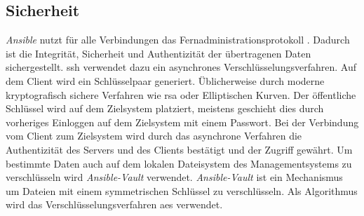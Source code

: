 \documentclass[titlepage]{report}
\begin{document}
\subsection*{Sicherheit}
\emph{Ansible} nutzt für alle Verbindungen das
Fernadministrationsprotokoll . Dadurch ist die Integrität,
Sicherheit und Authentizität der übertragenen Daten sichergestellt.
\gls{ssh} verwendet dazu ein asynchrones Verschlüsselungsverfahren. Auf
dem Client wird ein Schlüsselpaar generiert. Üblicherweise durch moderne
kryptografisch sichere Verfahren wie \gls{rsa} oder Elliptischen Kurven.
Der öffentliche Schlüssel wird auf dem Zielsystem platziert, meistens
geschieht dies durch vorheriges Einloggen auf dem Zielsystem mit einem
Passwort. Bei der Verbindung vom Client zum Zielsystem wird durch das
asynchrone Verfahren die Authentizität des Servers und des Clients
bestätigt und der Zugriff gewährt. Um bestimmte Daten auch auf dem
lokalen Dateisystem des Managementsystems zu verschlüsseln wird
\emph{Ansible\hyp{}Vault} verwendet. \emph{Ansible\hyp{}Vault} ist ein
Mechanismus um Dateien mit einem symmetrischen Schlüssel zu
verschlüsseln. Als Algorithmus wird das Verschlüsselungsverfahren
\gls{aes} verwendet\cite{ANSIBLEVAULT}.
\end{document}
